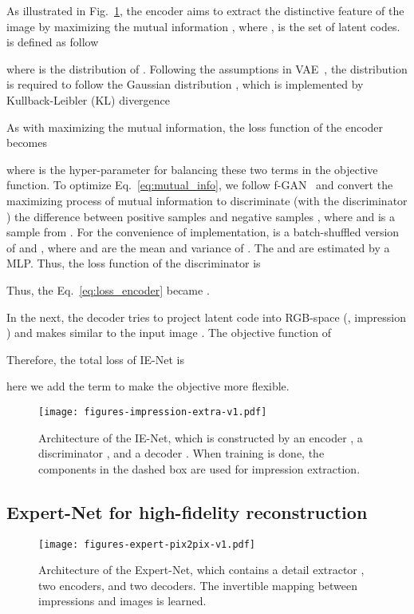 \documentclass[final]{cvpr}
\newcommand{\eq}{Eq.}
\begin{document}
As illustrated in Fig.~\ref{fig:info_cae}, 
the encoder  aims to extract the distinctive feature  of the image  by maximizing the mutual information , where ,  is the set of latent codes.  is defined as follow

where  is the distribution of .
Following the assumptions in VAE~\cite{B:kingma2013VAE}, the distribution  is required to follow the Gaussian distribution , which is implemented by Kullback-Leibler (KL) divergence

As with maximizing the mutual information, the loss function of the encoder  becomes

where  is the hyper-parameter for balancing these two terms in the objective function.
To optimize \eq~\eqref{eq:mutual_info}, we follow f-GAN~\cite{R:nowozin2016fGAN} and convert the maximizing process of mutual information to discriminate (with the discriminator ) the difference between positive samples  and negative samples , where  and  is a sample from . 
For the convenience of implementation,  is a batch-shuffled version of  and , where  and  are the mean and variance of . The  and  are estimated by a MLP.
Thus, the loss function of the discriminator  is 

Thus, the Eq.~\eqref{eq:loss_encoder} became .

In the next, the decoder  tries to project latent code  into RGB-space (\ie, impression ) and makes  similar to the input image . The objective function of 


Therefore, the total loss of IE-Net is

here we add the term  to make the objective more flexible.

\begin{figure}
	\begin{center}
		\texttt{[image: figures-impression-extra-v1.pdf]} 
	\end{center}
	\caption{Architecture of the IE-Net, which is constructed by an encoder , a discriminator , and a decoder . When training is done, the components in the dashed box are used for impression extraction.
	}
	\label{fig:info_cae}
\end{figure}

\subsection{Expert-Net for high-fidelity reconstruction} \label{sec:EN}

\begin{figure}
    \begin{center}
    	\texttt{[image: figures-expert-pix2pix-v1.pdf]} 
    \end{center}
	\vspace{-0.2cm}
    \caption{Architecture of the Expert-Net, which contains a detail extractor , two encoders, and two decoders. The invertible mapping between impressions and images is learned.}
    \label{fig:expert_pix2pix}
	\vspace{-0.4cm}
\end{figure}
\end{document}
